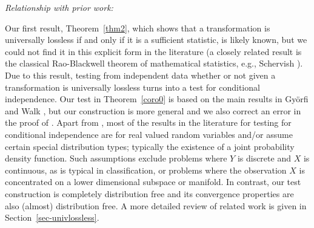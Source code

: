 \documentclass[11pt]{article}
\begin{document}
\medskip 

\noindent\emph{Relationship with prior work:}  

Our first result, Theorem~\ref{thm2}, which shows that a
transformation is universally lossless if and only if it is a
sufficient statistic, is likely known, but we could not find it in
this explicit form in the literature (a closely related result is the
classical Rao-Blackwell theorem of mathematical statistics, e.g.,
Schervish \cite[Theorem~3.22]{Sch95}). Due to this result, testing
from independent data whether or not given a transformation is
universally lossless turns into a test for conditional
independence. Our test in Theorem~\ref{coro0} is based on the main
results in Gy\"orfi and Walk \cite{GyWa12}, but our construction is
more general and we also correct an error in the proof of
\cite[Theorem~1]{GyWa12}. Apart from \cite{GyWa12}, most of the
results in the literature for testing for conditional independence are
for real valued random variables and/or assume certain special
distribution types; typically the existence of a joint probability
density function. Such assumptions exclude problems where $Y$ is
discrete and $X$ is continuous, as is typical in classification, or
problems where the observation $X$ is concentrated on a lower
dimensional subspace or manifold. In contrast, our test construction
is completely distribution free and its convergence properties are
also (almost) distribution free. A more detailed review of related
work is given in Section~\ref{sec-univlossless}.
\end{document}
